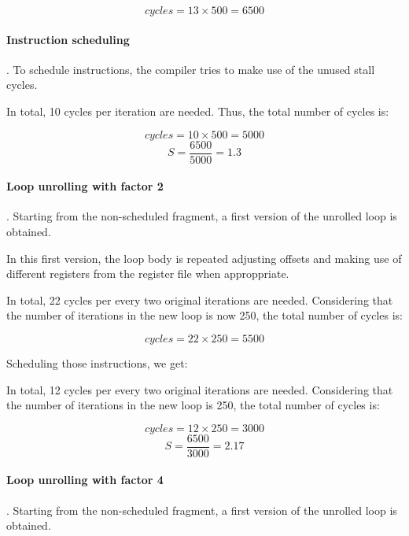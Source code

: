 \[
cycles = 13 \times 500 = 6500
\]

\paragraph{Instruction scheduling}.
To schedule instructions, the compiler tries to make use of the unused stall cycles.



In total, 10 cycles per iteration are needed.
Thus, the total number of cycles is:

\[
cycles = 10 \times 500 = 5000
\]
\[
S = \frac{6500}{5000} = 1.3
\]

\paragraph{Loop unrolling with factor 2}.
Starting from the non-scheduled fragment, a first version
of the unrolled loop is obtained.



In this first version, the loop body is repeated adjusting offsets
and making use of different registers from the register file when approppriate.

In total, 22 cycles per every two original iterations are needed.
Considering that the number of iterations in the new loop is now 250,
the total number of cycles is:

\[
cycles = 22 \times 250 = 5500
\]

Scheduling those instructions, we get:



In total, 12 cycles per every two original iterations are needed.
Considering that the number of iterations in the new loop is 250,
the total number of cycles is:

\[
cycles = 12 \times 250 = 3000
\]
\[
S = \frac{6500}{3000} = 2.17
\]

\paragraph{Loop unrolling with factor 4}.
Starting from the non-scheduled fragment, a first version
of the unrolled loop is obtained.



